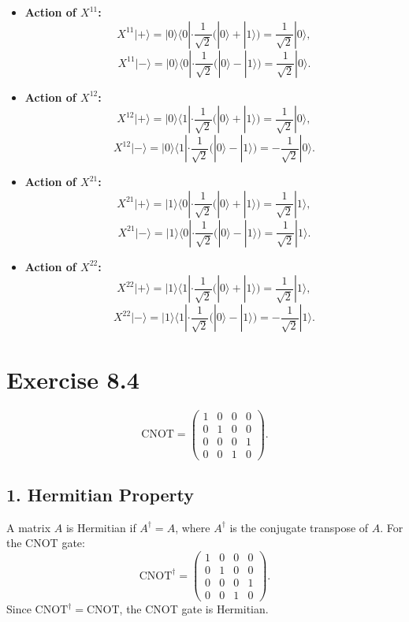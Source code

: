 \documentclass{article}
\begin{document}
\begin{itemize}
    \item \textbf{Action of \(X^{11}\):}
    \[
    X^{11}|+\rangle = |0\rangle\langle 0| \cdot \frac{1}{\sqrt{2}} \big(|0\rangle + |1\rangle \big) = \frac{1}{\sqrt{2}}|0\rangle,
    \]
    \[
    X^{11}|-\rangle = |0\rangle\langle 0| \cdot \frac{1}{\sqrt{2}} \big(|0\rangle - |1\rangle \big) = \frac{1}{\sqrt{2}}|0\rangle.
    \]

    \item \textbf{Action of \(X^{12}\):}
    \[
    X^{12}|+\rangle = |0\rangle\langle 1| \cdot \frac{1}{\sqrt{2}} \big(|0\rangle + |1\rangle \big) = \frac{1}{\sqrt{2}}|0\rangle,
    \]
    \[
    X^{12}|-\rangle = |0\rangle\langle 1| \cdot \frac{1}{\sqrt{2}} \big(|0\rangle - |1\rangle \big) = -\frac{1}{\sqrt{2}}|0\rangle.
    \]

    \item \textbf{Action of \(X^{21}\):}
    \[
    X^{21}|+\rangle = |1\rangle\langle 0| \cdot \frac{1}{\sqrt{2}} \big(|0\rangle + |1\rangle \big) = \frac{1}{\sqrt{2}}|1\rangle,
    \]
    \[
    X^{21}|-\rangle = |1\rangle\langle 0| \cdot \frac{1}{\sqrt{2}} \big(|0\rangle - |1\rangle \big) = \frac{1}{\sqrt{2}}|1\rangle.
    \]

    \item \textbf{Action of \(X^{22}\):}
    \[
    X^{22}|+\rangle = |1\rangle\langle 1| \cdot \frac{1}{\sqrt{2}} \big(|0\rangle + |1\rangle \big) = \frac{1}{\sqrt{2}}|1\rangle,
    \]
    \[
    X^{22}|-\rangle = |1\rangle\langle 1| \cdot \frac{1}{\sqrt{2}} \big(|0\rangle - |1\rangle \big) = -\frac{1}{\sqrt{2}}|1\rangle.
    \]
\end{itemize}
\section*{Exercise 8.4}

\[
\text{CNOT} = \begin{pmatrix}
1 & 0 & 0 & 0 \\
0 & 1 & 0 & 0 \\
0 & 0 & 0 & 1 \\
0 & 0 & 1 & 0
\end{pmatrix}.
\]

\subsection*{1. Hermitian Property}

A matrix \(A\) is Hermitian if \(A^\dagger = A\), where \(A^\dagger\) is the conjugate transpose of \(A\). For the CNOT gate:
\[
\text{CNOT}^\dagger = \begin{pmatrix}
1 & 0 & 0 & 0 \\
0 & 1 & 0 & 0 \\
0 & 0 & 0 & 1 \\
0 & 0 & 1 & 0
\end{pmatrix}.
\]
Since \(\text{CNOT}^\dagger = \text{CNOT}\), the CNOT gate is Hermitian.
\end{document}
